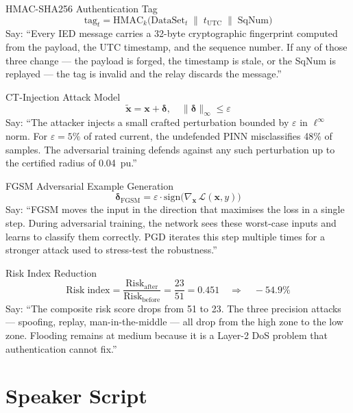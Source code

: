 \documentclass[12pt,a4paper]{article}
\begin{document}
\begin{formulabox}{HMAC-SHA256 Authentication Tag}
\[
  \mathrm{tag}_t = \mathrm{HMAC}_k\!\bigl(\mathrm{DataSet}_t \;\|\; t_\mathrm{UTC} \;\|\; \mathrm{SqNum}\bigr)
\]
Say: ``Every IED message carries a 32-byte cryptographic fingerprint computed from the payload, the UTC timestamp, and the sequence number. If any of those three change --- the payload is forged, the timestamp is stale, or the SqNum is replayed --- the tag is invalid and the relay discards the message.''
\end{formulabox}

\begin{formulabox}{CT-Injection Attack Model}
\[
  \tilde{\mathbf{x}} = \mathbf{x} + \bm{\delta}, \quad \|\bm{\delta}\|_\infty \leq \varepsilon
\]
Say: ``The attacker injects a small crafted perturbation bounded by $\varepsilon$ in $\ell^\infty$ norm. For $\varepsilon = 5\%$ of rated current, the undefended PINN misclassifies 48\% of samples. The adversarial training defends against any such perturbation up to the certified radius of 0.04~pu.''
\end{formulabox}

\begin{formulabox}{FGSM Adversarial Example Generation}
\[
  \bm{\delta}_\mathrm{FGSM} = \varepsilon \cdot \mathrm{sign}\!\bigl(\nabla_{\mathbf{x}}\,\mathcal{L}(\mathbf{x}, y)\bigr)
\]
Say: ``FGSM moves the input in the direction that maximises the loss in a single step. During adversarial training, the network sees these worst-case inputs and learns to classify them correctly. PGD iterates this step multiple times for a stronger attack used to stress-test the robustness.''
\end{formulabox}

\begin{formulabox}{Risk Index Reduction}
\[
  \mathrm{Risk\; index} = \frac{\mathrm{Risk}_\mathrm{after}}{\mathrm{Risk}_\mathrm{before}}
  = \frac{23}{51} = 0.451 \quad \Longrightarrow \quad -54.9\%
\]
Say: ``The composite risk score drops from 51 to 23. The three precision attacks --- spoofing, replay, man-in-the-middle --- all drop from the high zone to the low zone. Flooding remains at medium because it is a Layer-2 DoS problem that authentication cannot fix.''
\end{formulabox}

\section{Speaker Script}
\end{document}
